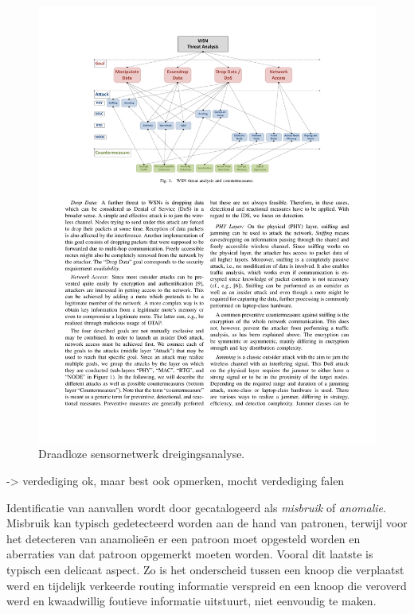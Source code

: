 \begin{figure}
  \centering
  \includegraphics[width=0.9\linewidth]{resources/wsn-threat-analysis.pdf}
  \caption{Draadloze sensornetwerk dreigingsanalyse.}
  \label{fig:wsn-threat-analysis}
\end{figure}

\TODO -> verdediging ok, maar best ook opmerken, mocht verdediging falen

Identificatie van aanvallen wordt door \cite{zhang2000intrusion} gecatalogeerd
als \emph{misbruik} of \emph{anomalie}. Misbruik kan typisch gedetecteerd
worden aan de hand van patronen, terwijl voor het detecteren van anamolie\"en
er een patroon moet opgesteld worden en aberraties van dat patroon opgemerkt
moeten worden. Vooral dit laatste is typisch een delicaat aspect. Zo is het
onderscheid tussen een knoop die verplaatst werd en tijdelijk verkeerde routing
informatie verspreid en een knoop die veroverd werd en kwaadwillig foutieve
informatie uitstuurt, niet eenvoudig te maken.
